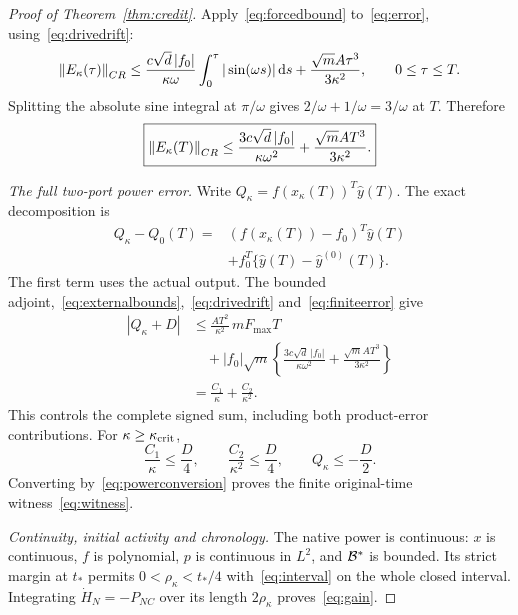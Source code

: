 \begin{proof}[Proof of Theorem~\ref{thm:credit}]
Apply~\eqref{eq:forcedbound} to~\eqref{eq:error}, using~\eqref{eq:drivedrift}:
\begin{equation}\label{eq:errorintegral}
\left\|E_\kappa(\tau)\right\|_{CR}
\le\frac{c\sqrt d\,|f_0|}{\kappa\omega}
\int_0^\tau|\sin(\omega s)|\,\mathrm d s
+\frac{\sqrt m A\tau^3}{3\kappa^2},
\qquad 0\le\tau\le T.
\end{equation}
Splitting the absolute sine integral at $\pi/\omega$ gives
$2/\omega+1/\omega=3/\omega$ at $T$. Therefore
\begin{equation}\label{eq:finiteerror}
\boxed{\left\|E_\kappa(T)\right\|_{CR}
\le\frac{3c\sqrt d\,|f_0|}{\kappa\omega^2}
+\frac{\sqrt m AT^3}{3\kappa^2}.}
\end{equation}

\textit{The full two-port power error.}
Write $Q_\kappa=f(x_\kappa(T))^T\widehat y(T)$. The exact decomposition is
\begin{equation}\label{eq:powerdecomposition}
\begin{aligned}
Q_\kappa-Q_0(T)
={}&(f(x_\kappa(T))-f_0)^T\widehat y(T)\\
&+f_0^T\{\widehat y(T)-\widehat y^{(0)}(T)\}.
\end{aligned}
\end{equation}
The first term uses the actual output. The bounded adjoint,~\eqref{eq:externalbounds},~\eqref{eq:drivedrift} and~\eqref{eq:finiteerror} give
\begin{equation}\label{eq:powererror}
\begin{aligned}
|Q_\kappa+D|
&\le\frac{AT^2}{\kappa^2}\,mF_{\max}T\\
&\quad+|f_0|\sqrt m\left\{
\frac{3c\sqrt d\,|f_0|}{\kappa\omega^2}
+\frac{\sqrt m AT^3}{3\kappa^2}\right\}\\
&=\frac{C_1}{\kappa}+\frac{C_2}{\kappa^2}.
\end{aligned}
\end{equation}
This controls the complete signed sum, including both product-error contributions. For $\kappa\ge\kappa_{\rm crit}$,
\begin{equation}\label{eq:allocation}
\frac{C_1}{\kappa}\le\frac D4,\qquad
\frac{C_2}{\kappa^2}\le\frac D4,\qquad
Q_\kappa\le-\frac D2.
\end{equation}
Converting by~\eqref{eq:powerconversion} proves the finite original-time witness~\eqref{eq:witness}.

\textit{Continuity, initial activity and chronology.}
The native power is continuous: $x$ is continuous, $f$ is polynomial, $p$ is continuous in $L^2$, and $\mathcal B^*$ is bounded. Its strict margin at $t_*$ permits
$0<\rho_\kappa<t_*/4$ with~\eqref{eq:interval} on the whole closed interval. Integrating $\dot H_N=-P_{NC}$ over its length $2\rho_\kappa$ proves~\eqref{eq:gain}.


\end{proof}
